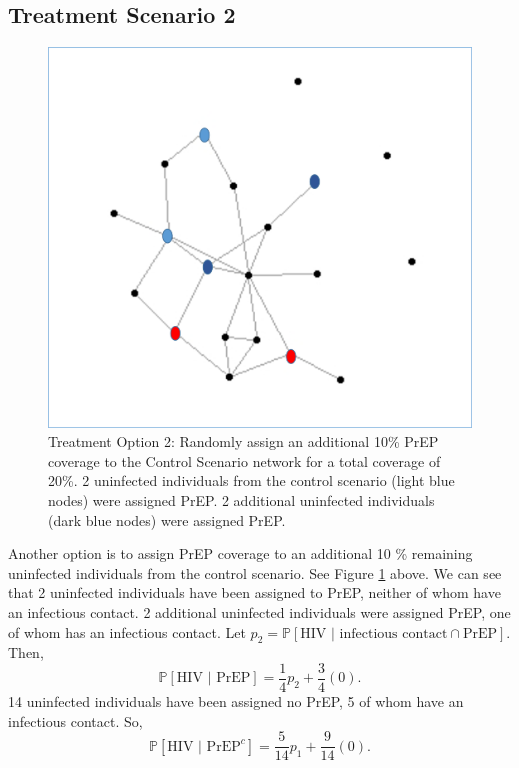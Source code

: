\documentclass{article}
\theoremstyle{definition}
\begin{document}
\subsection{Treatment Scenario 2} 
\begin{figure}[H]
    \centering
    \includegraphics[scale=0.5]{Figures/Network Example 4.png}
    \caption{Treatment Option 2: Randomly assign an additional 10\% PrEP coverage to the Control Scenario network for a total coverage of 20\%. 2 uninfected individuals from the control scenario (light blue nodes) were assigned PrEP. 2 additional uninfected individuals (dark blue nodes) were assigned PrEP. }
    \label{fig:Figure 5}
\end{figure}

Another option is to assign PrEP coverage to an additional 10 \% remaining uninfected individuals from the control scenario. See Figure \ref{fig:Figure 5} above. 
We can see that 2 uninfected individuals have been assigned to PrEP, neither of whom have an infectious contact. 2 additional uninfected individuals were assigned PrEP, one of whom has an infectious contact. Let $p_{2}=\mathbb{P}\left[\text{HIV } \vert \text{ infectious contact} \cap \text{PrEP}\right].$ Then, $$\mathbb{P}\left[\text{HIV } \vert \text{ PrEP}\right]=\frac{1}{4}p_{2}+\frac{3}{4}\left(0\right).$$  
14 uninfected individuals have been assigned no PrEP, 5 of whom have an infectious contact. So, $$\mathbb{P}\left[\text{HIV } \vert \text{ PrEP}^{c}\right]=\frac{5}{14}p_{1}+\frac{9}{14}\left(0\right).$$
\end{document}
